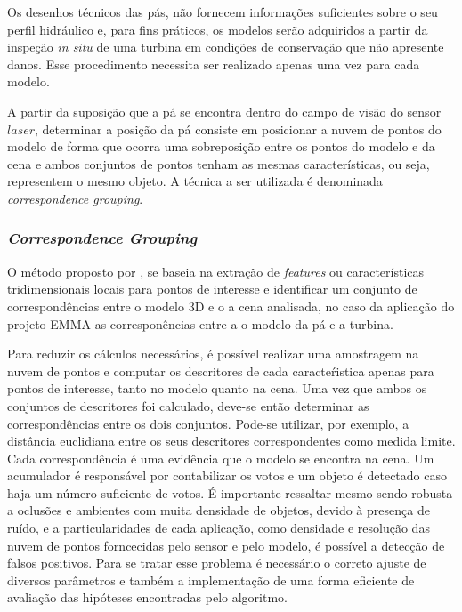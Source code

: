 Os desenhos técnicos das pás, não fornecem informações suficientes
sobre o seu perfil hidráulico e, para fins práticos, os modelos serão adquiridos
a partir da inspeção \textit{in situ} de uma turbina em condições de conservação
que não apresente danos. Esse procedimento necessita ser realizado apenas uma
vez para cada modelo. 

A partir da suposição que a pá se encontra dentro do campo de visão do sensor
$laser$, determinar a posição da pá consiste em posicionar a nuvem de pontos do
modelo de forma que ocorra uma sobreposição entre os pontos do modelo e da cena
e ambos conjuntos de pontos tenham as mesmas características, ou seja,
representem o mesmo objeto. A técnica a ser utilizada é denominada
\textit{correspondence grouping}. 


\subsubsection{\textit{Correspondence Grouping}}
 
O método proposto por \cite{Tombari2010a}, se baseia na extração de
\textit{features} ou características tridimensionais locais para pontos de
interesse e identificar um conjunto de correspondências entre o modelo 3D e o a
cena analisada, no caso da aplicação do projeto EMMA as corresponências entre a
o modelo da pá e a turbina. 

Para reduzir os cálculos necessários, é possível realizar uma amostragem na
nuvem de pontos e computar os descritores de cada caracteŕistica apenas para
pontos de interesse, tanto no modelo quanto na cena. Uma vez que ambos os
conjuntos de descritores foi calculado, deve-se então determinar as
correspondências entre os dois conjuntos. Pode-se utilizar, por exemplo, a
distância euclidiana entre os seus descritores correspondentes como medida
limite. Cada correspondência é uma evidência que o modelo se encontra na cena. 
Um acumulador é responsável por contabilizar os votos e um objeto é detectado
caso haja um número suficiente de votos. É importante ressaltar mesmo sendo
robusta a oclusões e ambientes com muita densidade de objetos, devido à presença de
ruído, e a particularidades de cada aplicação, como densidade e resolução das
nuvem de pontos forncecidas pelo sensor e pelo modelo, é possível a detecção de
falsos positivos. Para se tratar esse problema é necessário o correto ajuste de
diversos parâmetros e também a implementação de uma forma eficiente de avaliação
das hipóteses encontradas pelo algoritmo. 


